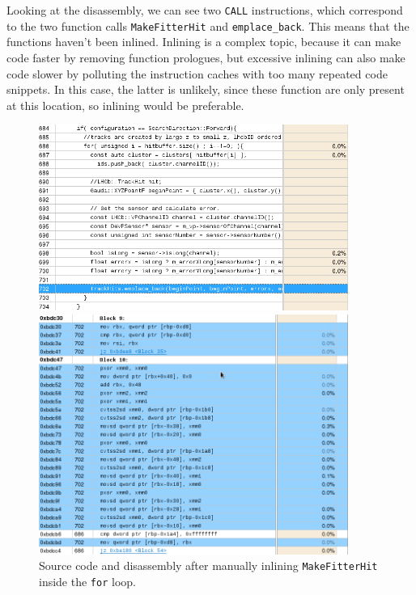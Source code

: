 \documentclass[12pt]{article}
\newcommand{\code}[1]{\texttt{#1}}
\begin{document}
Looking at the disassembly, we can see two \code{CALL} instructions, which correspond to the two function calls \code{MakeFitterHit} and \code{emplace\_back}. This means that the functions haven't been inlined. Inlining is a complex topic, because it can make code faster by removing function prologues, but excessive inlining can also make code slower by polluting the instruction caches with too many repeated code snippets. In this case, the latter is unlikely, since these function are only present at this location, so inlining would be preferable.

\begin{figure}[H]
	\begin{center}
		\includegraphics[width=0.9\textwidth]{kalmanfit_disasm_opt_src_inlined}
	\end{center}
	\begin{center}
		\includegraphics[width=0.9\textwidth]{kalmanfit_disasm_opt_asm_inlined}
	\end{center}
	\caption[Code growth performance mitigated]{Source code and disassembly after manually inlining \code{MakeFitterHit} inside the \code{for} loop.}
	\label{fig_kalman_disasm_src_inlined}
\end{figure}
\end{document}

